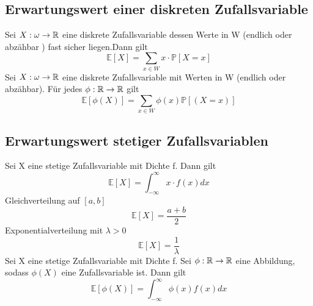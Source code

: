 \subsection{Erwartungswert einer diskreten Zufallsvariable}
\Satz[4.6] Sei \( X: \omega \rightarrow \mathbb{R} \) eine diskrete Zufallsvariable dessen Werte in W (endlich oder abzähbar ) fast sicher liegen.Dann gilt \[ \mathbb{E}[X] = \sum_{x \in W} x \cdot \mathbb{P}[X = x]\]
\Satz[4.7] Sei \( X: \omega \rightarrow \mathbb{R} \) eine diskrete Zufallsvariable mit Werten in W (endlich oder abzähbar). Für jedes \(\phi : \mathbb{R} \rightarrow \mathbb{R} \) gilt \[ \mathbb{E}[\phi(X)] = \sum_{x \in W} \phi(x) \mathbb{P}[(X = x)]\]
\subsection{Erwartungswert stetiger Zufallsvariablen}
\Satz[4.8] Sei X eine stetige Zufallsvariable mit Dichte f. Dann gilt \[\mathbb{E}[X] = \int_{-\infty}^{\infty} x \cdot f(x)dx\]
\Bsp[4.8A] Gleichverteilung auf \([a,b]\) \[\mathbb{E}[X] = \frac{a + b}{2}\] Exponentialverteilung mit \( \lambda > 0 \) \[\mathbb{E}[X] = \frac{1}{\lambda}\]
\Theo[4.9] Sei X eine stetige Zufallsvariable mit Dichte f. Sei \(\phi : \mathbb{R} \rightarrow \mathbb{R} \) eine Abbildung, sodass \( \phi(X )\) eine Zufallsvariable ist. Dann gilt \[ \mathbb{E}[\phi(X)] = \int_{-\infty}^{\infty} \phi(x)f(x)dx\]
